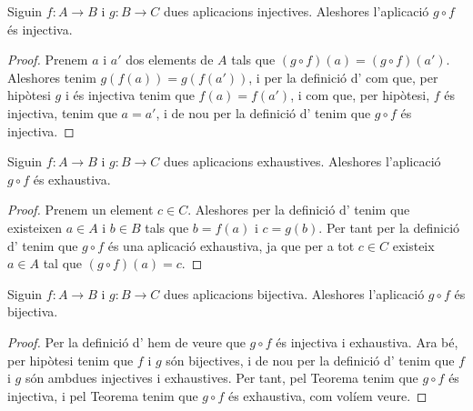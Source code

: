 \documentclass[../../Main.tex]{subfiles}
\begin{document}
	\begin{theorem}
		\label{thm:composició d'injectives injectiva}
		Siguin \(f\colon A\rightarrow B\) i \(g\colon B\rightarrow C\) dues aplicacions injectives. Aleshores l'aplicació \(g\circ f\) és injectiva.
		\begin{proof}
			Prenem \(a\) i \(a'\) dos elements de \(A\) tals que \((g\circ f)(a)=(g\circ f)(a')\). Aleshores tenim \(g(f(a))=g(f(a'))\), i per la definició d' com que, per hipòtesi \(g\) i és injectiva tenim que \(f(a)=f(a')\), i com que, per hipòtesi, \(f\) és injectiva, tenim que \(a=a'\), i de nou per la definició d' tenim que \(g\circ f\) és injectiva.
		\end{proof}
	\end{theorem}
	\begin{theorem}
		\label{thm:composició d'exhaustives exhaustiva}
		Siguin \(f\colon A\rightarrow B\) i \(g\colon B\rightarrow C\) dues aplicacions exhaustives. Aleshores l'aplicació \(g\circ f\) és exhaustiva.
		\begin{proof}
			Prenem un element \(c\in C\). Aleshores per la definició d' tenim que existeixen \(a\in A\) i \(b\in B\) tals que \(b=f(a)\) i \(c=g(b)\). Per tant per la definició d' tenim que \(g\circ f\) és una aplicació exhaustiva, ja que per a tot \(c\in C\) existeix \(a\in A\) tal que \((g\circ f)(a)=c\).
		\end{proof}
	\end{theorem}
	\begin{theorem}
		\label{thm:composició de bijectives bijectiva}
		\label{thm:conjugació de bijectives bijectiva}
		Siguin \(f\colon A\rightarrow B\) i \(g\colon B\rightarrow C\) dues aplicacions bijectiva. Aleshores l'aplicació \(g\circ f\) és bijectiva.
		\begin{proof}
			Per la definició d' hem de veure que \(g\circ f\) és injectiva i exhaustiva. Ara bé, per hipòtesi tenim que \(f\) i \(g\) són bijectives, i de nou per la definició d' tenim que \(f\) i \(g\) són ambdues injectives i exhaustives. Per tant, pel Teorema  tenim que \(g\circ f\) és injectiva, i pel Teorema  tenim que \(g\circ f\) és exhaustiva, com volíem veure.
		\end{proof}
	\end{theorem}
\end{document}
